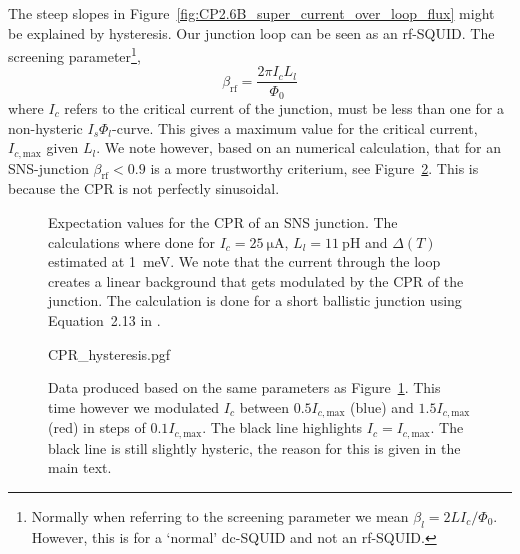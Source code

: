 The steep slopes in Figure~\ref{fig:CP2.6B_super_current_over_loop_flux} might be explained by hysteresis. Our junction loop can be seen as an rf-SQUID\cite{clarkeSQUIDHandbook2004}. The screening parameter\footnote{Normally when referring to the screening parameter we mean $\beta_l = 2LI_c/\Phi_0$. However, this is for a `normal' dc-SQUID and not an rf-SQUID.},
\begin{equation}
	\beta_{\text{rf}} = \frac{2\pi I_c L_l}{\Phi_0}
\end{equation}
where $I_c$ refers to the critical current of the junction, must be less than one for a non-hysteric $I_s\Phi_l$-curve\cite{clarkeSQUIDHandbook2004,frolovMeasurementCurrentPhaseRelation2004}. This gives a maximum value for the critical current, $I_{c,\text{max}}$ given $L_l$. We note however, based on an numerical calculation, that for an SNS-junction $\beta_{\text{rf}} < 0.9$ is a more trustworthy criterium, see Figure~\ref{fig:CPR-hysteresis}. This is because the CPR is not perfectly sinusoidal\cite{vermeerSTMbasedScanningSQUID2021,likharevSuperconductingWeakLinks1979}.

\begin{figure}[ht!]
	

	\caption{Expectation values for the CPR of an SNS junction. The calculations where done for $I_c=\qty{25}{\micro\ampere}$, $L_l=\qty{11}{\pico\henry}$ and $\Delta(T)$ estimated at \qty{1}{\milli\electronvolt}. We note that the current through the loop creates a linear background that gets modulated by the CPR of the junction. The calculation is done for a short ballistic junction using Equation~2.13 in \cite{vermeerSTMbasedScanningSQUID2021}.}
	\label{fig:analytical-prediction}
\end{figure}

\begin{figure}
	\centering
	{CPR_hysteresis.pgf}
	\caption{Data produced based on the same parameters as Figure~\ref{fig:analytical-prediction}. This time however we modulated $I_c$ between $0.5I_{c,\text{max}}$ (blue) and $1.5I_{c,\text{max}}$ (red) in steps of $0.1I_{c,\text{max}}$. The black line highlights $I_c=I_{c,\text{max}}$. The black line is still slightly hysteric, the reason for this is given in the main text.}
	\label{fig:CPR-hysteresis}
\end{figure}

